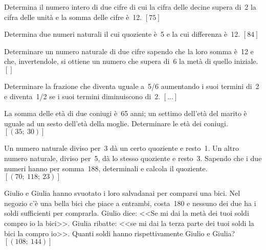\begin{multicols}{2}
\begin{esercizio}[\Ast]
 \label{ese:22.84}
Determina il numero intero di due cifre di cui la cifra delle decine 
supera di~2 la cifra delle unità e la somma delle cifre è~12.
\hfill $\left[75\right]$
\end{esercizio}

\begin{esercizio}[\croce]
 \label{ese:22.85}
Determina due numeri naturali il cui quoziente è~5 e la cui differenza è~12.
\hfill $\left[84\right]$
\end{esercizio}

\begin{esercizio}[\Ast, \croce]
 \label{ese:22.86}
Determinare un numero naturale di due cifre sapendo che la loro somma
è~12 e che, invertendole, si ottiene un numero che supera di~6 la
metà di quello iniziale.
\hfill $\left[\right]$
\end{esercizio}

\begin{esercizio}[\croce]
 \label{ese:22.87}
Determinare la frazione che diventa uguale a~5/6 aumentando i suoi
termini di~2 e diventa~1/2 se i suoi termini diminuiscono di~2.
\hfill $\left[...\right]$
\end{esercizio}

\begin{esercizio}[\Ast, \croce]
 \label{ese:22.88}
La somma delle età di due coniugi è~65 anni; un settimo
dell'età del marito è uguale ad un sesto
dell'età della moglie. Determinare le età dei
coniugi.
\hfill $\left[(35;~30)\right]$
\end{esercizio}

\begin{esercizio}[\Ast, \croce]
 \label{ese:22.89}
Un numero naturale diviso per~3 dà un certo quoziente e resto~1. Un
altro numero naturale, diviso per~5, dà lo stesso quoziente e resto~3.
Sapendo che i due numeri hanno per somma~188, determinali e calcola
il quoziente.
\hfill $\left[(70;~118;~23)\right]$
\end{esercizio}

\begin{esercizio}[\Ast]
 \label{ese:22.90}
Giulio e Giulia hanno svuotato i loro
salvadanai per comparsi una bici. Nel negozio c'è
una bella bici che piace a entrambi, costa{\officialeuro}~180 e nessuno dei
due ha i soldi sufficienti per comprarla. Giulio dice:
<<Se mi dai la metà dei tuoi soldi compro io la
bici>>. Giulia ribatte: <<se mi dai la terza
parte dei tuoi soldi la bici la compro io>>. Quanti soldi
hanno rispettivamente Giulio e Giulia?
\hfill $\left[(108;~144)\right]$
\end{esercizio}


\end{multicols}
